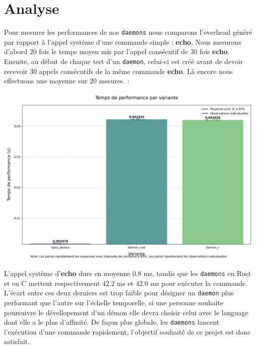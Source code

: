 \documentclass{article}
\begin{document}

\section{Analyse}
\label{sec:analyse}
Pour mesurer les performances de nos \texttt{daemons} nous comparons l'overhead généré par rapport à l'appel système d'une commande simple : \textbf{echo}.
Nous mesurons d'abord 20 fois le temps moyen mis par l'appel consécutif de 30 fois \textbf{echo}. Ensuite, au début de chaque test d'un \texttt{daemon}, celui-ci est créé avant de devoir recevoir 30 appels consécutifs de la même commande \textbf{echo}. Là encore nous effectuons une moyenne sur 20 mesures. :


\centerline{\includegraphics[scale=0.4]{performance_comparison}}

L'appel système d'\textbf{echo} dure en moyenne 0.8 ms, tandis que les \texttt{daemons} en Rust et en C mettent respectivement 42.2 ms et 42.0 ms pour exécuter la commande. L'écart entre ces deux derniers est trop faible pour désigner un \texttt{daemon} plus performant que l'autre sur l'échelle temporelle, si une personne souhaite poursuivre le dévellopement d'un démon elle devra choisir celui avec le language dont elle a le plus d'affinité. De façon plus globale, les \texttt{daemons} lancent l'exécution d'une commande rapidement, l'objectif souhaité de ce projet est donc satisfait.\\
\end{document}
